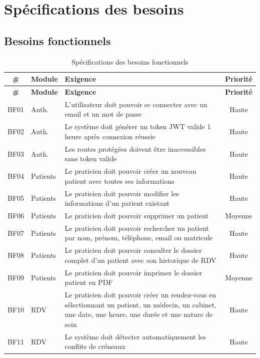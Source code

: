 \section{Spécifications des besoins}

\subsection{Besoins fonctionnels}

\begin{longtable}{@{} c l p{7.5cm} c @{}}
\toprule
\textbf{\#} & \textbf{Module} & \textbf{Exigence} & \textbf{Priorité} \\
\midrule
\endfirsthead
\toprule
\textbf{\#} & \textbf{Module} & \textbf{Exigence} & \textbf{Priorité} \\
\midrule
\endhead
\bottomrule
\caption{Spécifications des besoins fonctionnels}
\label{tab:besoins_fonctionnels}
\endfoot
BF01 & Auth. & L'utilisateur doit pouvoir se connecter avec un email et un mot de passe & Haute \\
BF02 & Auth. & Le système doit générer un token JWT valide 1 heure après connexion réussie & Haute \\
BF03 & Auth. & Les routes protégées doivent être inaccessibles sans token valide & Haute \\
BF04 & Patients & Le praticien doit pouvoir créer un nouveau patient avec toutes ses informations & Haute \\
BF05 & Patients & Le praticien doit pouvoir modifier les informations d'un patient existant & Haute \\
BF06 & Patients & Le praticien doit pouvoir supprimer un patient & Moyenne \\
BF07 & Patients & Le praticien doit pouvoir rechercher un patient par nom, prénom, téléphone, email ou matricule & Haute \\
BF08 & Patients & Le praticien doit pouvoir consulter le dossier complet d'un patient avec son historique de RDV & Haute \\
BF09 & Patients & Le praticien doit pouvoir imprimer le dossier patient en PDF & Moyenne \\
BF10 & RDV & Le praticien doit pouvoir créer un rendez-vous en sélectionnant un patient, un médecin, un cabinet, une date, une heure, une durée et une nature de soin & Haute \\
BF11 & RDV & Le système doit détecter automatiquement les conflits de créneaux & Haute \\

\end{longtable}
